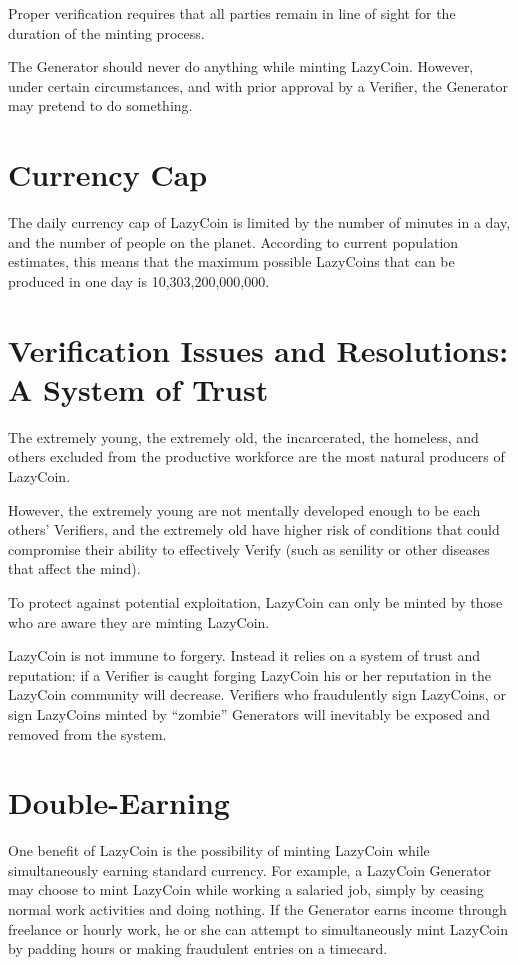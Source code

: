 Proper verification requires that all parties remain in line of sight for the duration of the minting process.

The Generator should never do anything while minting LazyCoin. However, under certain circumstances, and with prior approval by a Verifier, the Generator may pretend to do something.


\section{Currency Cap}
The daily currency cap of LazyCoin is limited by the number of minutes in a day, and the number of people on the planet. According to current population estimates, this means that the maximum possible LazyCoins that can be produced in one day is 10,303,200,000,000.


\section{Verification Issues and Resolutions: A System of Trust}
The extremely young, the extremely old, the incarcerated, the homeless, and others excluded from the productive workforce are the most natural producers of LazyCoin.

However, the extremely young are not mentally developed enough to be each others’ Verifiers, and the extremely old have higher risk of conditions that could compromise their ability to effectively Verify (such as senility or other diseases that affect the mind). 

To protect against potential exploitation, LazyCoin can only be minted by those who are aware they are minting LazyCoin. 

LazyCoin is not immune to forgery. Instead it relies on a system of trust and reputation: if a Verifier is caught forging LazyCoin his or her reputation in the LazyCoin community will decrease. Verifiers who fraudulently sign LazyCoins, or sign LazyCoins minted by “zombie” Generators will inevitably be exposed and removed from the system.

\section{Double-Earning}
One benefit of LazyCoin is the possibility of minting LazyCoin while simultaneously earning standard currency. For example, a LazyCoin Generator may choose to mint LazyCoin while working a salaried job, simply by ceasing normal work activities and doing nothing. If the Generator earns income through freelance or hourly work, he or she can attempt to simultaneously mint LazyCoin by padding hours or making fraudulent entries on a timecard. 

